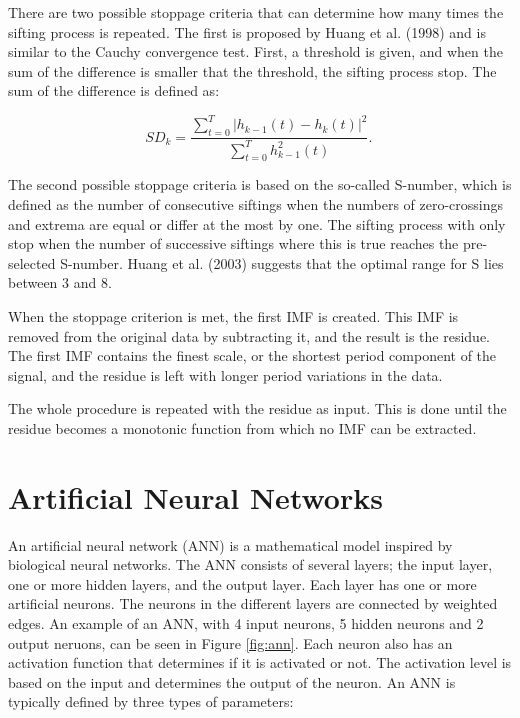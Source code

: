 \documentclass[12pt]{article}
\begin{document}
	There are two possible stoppage criteria that can determine how many times the sifting process is repeated. The first is proposed by Huang et al. (1998) and is similar to the Cauchy convergence test. First, a threshold is given, and when the sum of the difference is smaller that the threshold, the sifting process stop. The sum of the difference is defined as: 
	
	\begin{equation}
		SD_k=\frac{\sum_{t=0}^{T}|h_{k-1}(t)-h_k(t)|^2}{\sum_{t=0}^{T} h_{k-1}^2 (t)}.\,
	\end{equation}
	
	The second possible stoppage criteria is based on the so-called S-number, which is defined as the number of consecutive siftings when the numbers of zero-crossings and extrema are equal or differ at the most by one. The sifting process with only stop when the number of successive siftings where this is true reaches the pre-selected S-number. Huang et al. (2003) suggests that the optimal range for S lies between 3 and 8. 
	
	When the stoppage criterion is met, the first IMF is created. This IMF is removed from the original data by subtracting it, and the result is the residue. The first IMF contains the finest scale, or the shortest period component of the signal, and the residue is left with longer period variations in the data.
	
	The whole procedure is repeated with the residue as input. This is done until the residue becomes a monotonic function from which no IMF can be extracted. 
	


\newpage
\section{Artificial Neural Networks}
	\label{sec:ann}
	An artificial neural network (ANN) is a mathematical model inspired by biological neural networks. The ANN consists of several layers; the input layer, one or more hidden layers, and the output layer. Each layer has one or more artificial neurons. The neurons in the different layers are connected by weighted edges. An example of an ANN, with 4 input neurons, 5 hidden neurons and 2 output neruons, can be seen in Figure \ref{fig:ann}. Each neuron also has an activation function that determines if it is activated or not. The activation level is based on the input and determines the output of the neuron. An ANN is typically defined by three types of parameters:
	
\end{document}
